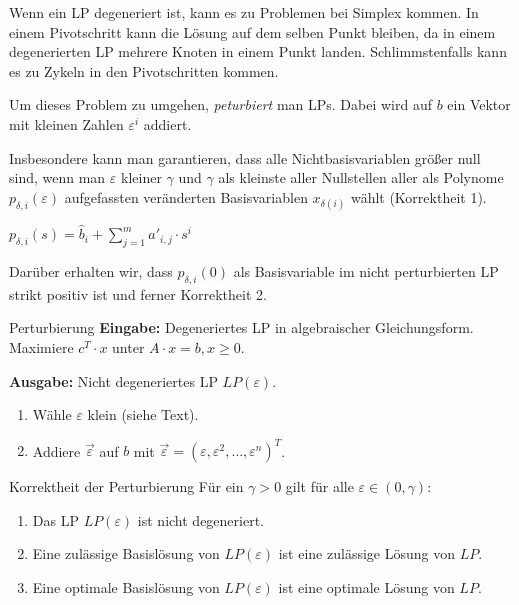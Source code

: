 \documentclass{panikzettel}
\begin{document}
\begin{halfboxl}
Wenn ein LP degeneriert ist, kann es zu Problemen bei Simplex kommen.
In einem Pivotschritt kann die Lösung auf dem selben Punkt bleiben, da in einem degenerierten LP mehrere Knoten in einem Punkt landen.
Schlimmstenfalls kann es zu Zykeln in den Pivotschritten kommen.

Um dieses Problem zu umgehen, \emph{peturbiert} man LPs.
Dabei wird auf $b$ ein Vektor mit kleinen Zahlen $\varepsilon^i$ addiert.

Insbesondere kann man garantieren, dass alle Nichtbasisvariablen größer null sind, wenn man $\varepsilon$ kleiner $\gamma$ und $\gamma$ als kleinste aller Nullstellen aller als Polynome $p_{\delta, i}(\varepsilon)$ aufgefassten veränderten Basisvariablen $x_{\delta(i)}$ wählt (Korrektheit 1).

\begin{tightcenter}
$p_{\delta,i}(s) = \hat{b}_i + \sum_{j=1}^m a'_{i,j} \cdot s^i$
\end{tightcenter}

Darüber erhalten wir, dass $p_{\delta, i}(0)$ als Basisvariable im nicht perturbierten LP strikt positiv ist und ferner Korrektheit 2.
\end{halfboxl}%
\begin{halfboxr}
\vspace{-\baselineskip}
\begin{algo}{Perturbierung}
\textbf{Eingabe:} Degeneriertes LP in algebraischer Gleichungsform. \\
\-\hspace{1em} Maximiere $c^T \cdot x$ unter $A \cdot x = b, x \geq 0$.

\textbf{Ausgabe:} Nicht degeneriertes LP $LP(\varepsilon)$.
\tcblower
\begin{enumerate}
    \item Wähle $\varepsilon$ klein (siehe Text).
    \item Addiere $\vec{\varepsilon}$ auf $b$ mit $\vec{\varepsilon} = (\varepsilon, \varepsilon^2, \dots, \varepsilon^n)^T$.
\end{enumerate}
\end{algo}

\begin{theo}{Korrektheit der Perturbierung}
Für ein $\gamma > 0$ gilt für alle $\varepsilon \in (0,\gamma)$:
\begin{enumerate}
    \item Das LP $LP(\varepsilon)$ ist nicht degeneriert.
    \item Eine zulässige Basislösung von $LP(\varepsilon)$ ist eine zulässige Lösung von $LP$.
    \item Eine optimale Basislösung von $LP(\varepsilon)$ ist eine optimale Lösung von $LP$.
\end{enumerate}
\end{theo}
\end{halfboxr}
\end{document}
